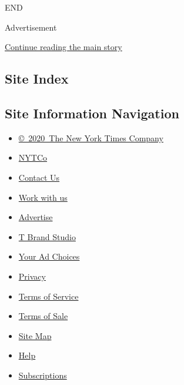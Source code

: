 END

Advertisement

\protect\hyperlink{after-bottom}{Continue reading the main story}

\hypertarget{site-index}{%
\subsection{Site Index}\label{site-index}}

\hypertarget{site-information-navigation}{%
\subsection{Site Information
Navigation}\label{site-information-navigation}}

\begin{itemize}
\tightlist
\item
  \href{https://help.nytimes3xbfgragh.onion/hc/en-us/articles/115014792127-Copyright-notice}{©~2020~The
  New York Times Company}
\end{itemize}

\begin{itemize}
\tightlist
\item
  \href{https://www.nytco.com/}{NYTCo}
\item
  \href{https://help.nytimes3xbfgragh.onion/hc/en-us/articles/115015385887-Contact-Us}{Contact
  Us}
\item
  \href{https://www.nytco.com/careers/}{Work with us}
\item
  \href{https://nytmediakit.com/}{Advertise}
\item
  \href{http://www.tbrandstudio.com/}{T Brand Studio}
\item
  \href{https://www.nytimes3xbfgragh.onion/privacy/cookie-policy\#how-do-i-manage-trackers}{Your
  Ad Choices}
\item
  \href{https://www.nytimes3xbfgragh.onion/privacy}{Privacy}
\item
  \href{https://help.nytimes3xbfgragh.onion/hc/en-us/articles/115014893428-Terms-of-service}{Terms
  of Service}
\item
  \href{https://help.nytimes3xbfgragh.onion/hc/en-us/articles/115014893968-Terms-of-sale}{Terms
  of Sale}
\item
  \href{https://spiderbites.nytimes3xbfgragh.onion}{Site Map}
\item
  \href{https://help.nytimes3xbfgragh.onion/hc/en-us}{Help}
\item
  \href{https://www.nytimes3xbfgragh.onion/subscription?campaignId=37WXW}{Subscriptions}
\end{itemize}
